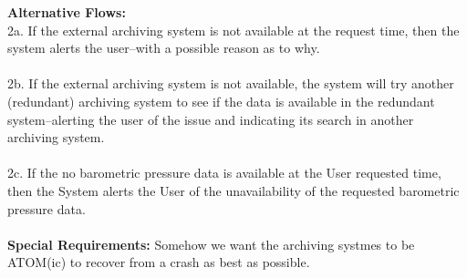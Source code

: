 \documentclass[letterpaper]{article}
\begin{document}
\textbf{Alternative Flows:  }\\
2a.  If the external archiving system is not available at the request
time, then the system alerts the user--with a possible reason as to
why.\\\\
2b.  If the external archiving system is not available, the system
will try another (redundant) archiving system to see if the data is
available in the redundant system--alerting the user of the issue and
indicating its search in another archiving system.\\\\
2c.  If the no barometric pressure data is available at the User
requested
time, then the System alerts the User of the unavailability of the
requested barometric pressure data.\\\\
\textbf{Special Requirements:  }Somehow we want the archiving systmes
to be ATOM(ic) to recover from a crash as best as possible.\\\\
\end{document}
